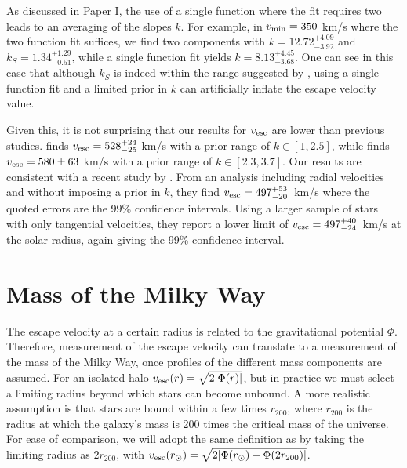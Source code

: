 \documentclass[twocolumn,preprintnumbers]{aastex63}
\newcommand{\vesc}{v_{\rm esc}}
\newcommand{\vmin}{v_{\rm min}}
\begin{document}
As discussed in Paper I, the use of a single function where the fit requires two leads to an averaging of the slopes $k$. 
For example, in $\vmin = 350$ km/s where the two function fit suffices, we find two components with $k = 12.72^{+4.09}_{-3.92}$ and $k_S = 1.34^{+1.29}_{-0.51}$, while a single function fit yields $k = 8.13^{+4.45}_{-3.68}$. One can see in this case that although $k_S$ is indeed within the range suggested by \cite{2019arXiv190102016D}, using a single function fit and a limited prior in $k$ can artificially inflate the escape velocity value.  

Given this, it is not surprising that our results for $\vesc$ are lower than previous studies. \cite{2019arXiv190102016D} finds $\vesc = 528^{+24}_{-25}$ km/s with a prior range of $k \in [1,2.5]$, while \cite{2018A&A...616L...9M} finds $\vesc =580 \pm 63 $ km/s with a prior range of $k \in [2.3,3.7]$. Our results are consistent with a recent study by  \cite{2020arXiv200616283K}. From an analysis including radial velocities and without imposing a prior in $k$, they find  $\vesc = 497^{+53}_{-20}$~km/s where the quoted errors are the 99\% confidence intervals. Using a larger sample of stars with only tangential velocities, they report a lower limit of $\vesc = 497^{+40}_{-24}$~km/s at the solar radius, again giving the 99\% confidence interval. 

 



\section{Mass of the Milky Way}
\label{sec:mass_mw}

The escape velocity at a certain radius is related to the gravitational potential $\Phi$. Therefore, measurement of the escape velocity can translate to a measurement of the mass of the Milky Way, once profiles of the different mass components are assumed. For an isolated halo $\vesc (r) = \sqrt{2 |\Phi(r)|}$, but in practice we must select a limiting radius beyond which stars can become unbound. A more realistic assumption is that stars are bound within a few times $r_{200}$, where $r_{200}$ is the radius at which the galaxy's mass is 200 times the critical mass of the universe. For ease of comparison, we will adopt the same definition as \cite{2019arXiv190102016D} by taking the limiting radius as $2 r_{200}$, with $\vesc(r_{\odot}) = \sqrt{2 |\Phi (r_{\odot}) - \Phi(2r_{200}) |}$.  
\end{document}
